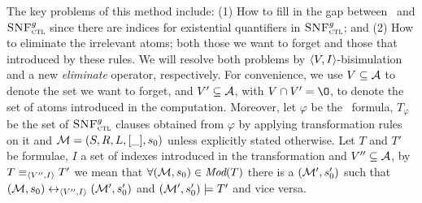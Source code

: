 \documentclass[letterpaper]{article} %
\begin{document}
The key problems of this method include: (1) How to fill in  the gap between \CTL\ and ${\textsc{SNF}_{\textsc{ctl}}^g}$ since there are indices for existential quantifiers in ${\textsc{SNF}_{\textsc{ctl}}^g}$; and (2) How to eliminate the irrelevant atoms; both those we want to forget and those that introduced by these rules.
We will resolve both problems by ${\langle{V,I}\rangle}$-bisimulation and a new \emph{eliminate} operator, respectively.
For convenience, we use $V\subseteq {\cal A}$ to denote the set we want to forget, and $V' \subseteq {\cal A}$, with $V \cap V'={\O}$,  to denote the set of atoms introduced in the computation.  Moreover, let $\varphi$  be the \CTL\ formula, $T_{\varphi}$ be the set of ${\textsc{SNF}_{\textsc{ctl}}^g}$ clauses obtained from $\varphi$ by applying transformation rules on it  and ${\cal M}=(S,R,L,[\_], s_0)$ unless explicitly stated otherwise.
 Let $T$ and $T'$ be formulae, $I$ a set of indexes introduced in the transformation and $V''\subseteq {\cal A}$, by $T\equiv_{{\langle{V'', I}\rangle}} T'$ we mean that $\forall ({\cal M}, s_0) \in \textit{Mod}(T)$ there is a $({\cal M}', s_0')$ such that $({\cal M},s_0) \leftrightarrow_{{\langle{V'', I}\rangle}} ({\cal M}',s_0')$ and $({\cal M}', s_0') \models T'$ and vice versa.

\end{document}
